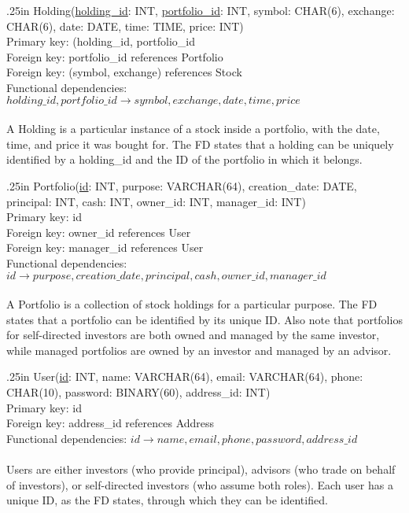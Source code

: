 \documentclass[letterpaper]{report}
\begin{document}
\hangindent .25in
{\sffamily Holding(\underline{holding\_id}: INT, \underline{portfolio\_id}: INT, symbol: CHAR(6), exchange: CHAR(6), date: DATE, time: TIME, price: INT)} \\
Primary key: {\sffamily (holding\_id, portfolio\_id} \\
Foreign key: {\sffamily portfolio\_id} references {\sffamily Portfolio} \\
Foreign key: {\sffamily (symbol, exchange)} references {\sffamily Stock} \\
Functional dependencies: $holding\_id, portfolio\_id \to symbol, exchange, date, time, price$ \\\\
A {\sffamily Holding} is a particular instance of a stock inside a portfolio, with the date, time, and price it was bought for. The FD states that a holding can be uniquely identified by a {\sffamily holding\_id} and the ID of the portfolio in which it belongs.

\hangindent .25in
{\sffamily Portfolio(\underline{id}: INT, purpose: VARCHAR(64), creation\_date: DATE, principal: INT, cash: INT, owner\_id: INT, manager\_id: INT)} \\
Primary key: {\sffamily id} \\
Foreign key: {\sffamily owner\_id} references {\sffamily User} \\
Foreign key: {\sffamily manager\_id} references {\sffamily User} \\
Functional dependencies: $id \to purpose, creation\_date, principal, cash, owner\_id, manager\_id$ \\\\
A {\sffamily Portfolio} is a collection of stock holdings for a particular purpose. The FD states that a portfolio can be identified by its unique ID. Also note that portfolios for self-directed investors are both owned and managed by the same investor, while managed portfolios are owned by an investor and managed by an advisor.


\hangindent .25in
{\sffamily User(\underline{id}: INT, name: VARCHAR(64), email: VARCHAR(64), phone: CHAR(10), password: BINARY(60), address\_id: INT)}\\
Primary key: {\sffamily id} \\
Foreign key: {\sffamily address\_id} references {\sffamily Address} \\
Functional dependencies: $id \to name, email, phone, password, address\_id$ \\\\
{\sffamily User}s are either investors (who provide principal), advisors (who trade on behalf of investors), or self-directed investors (who assume both roles). Each user has a unique ID, as the FD states, through which they can be identified.
\end{document}
